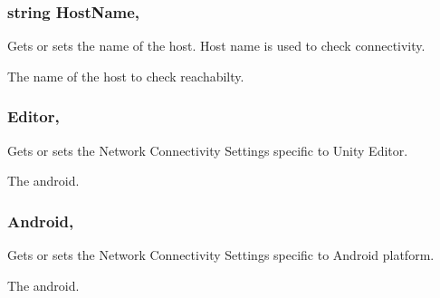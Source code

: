 \subsubsection[{Host\+Name}]{\setlength{\rightskip}{0pt plus 5cm}string Host\+Name\hspace{0.3cm}{\ttfamily [get]}, {\ttfamily [set]}}\label{class_voxel_busters_1_1_native_plugins_1_1_network_connectivity_settings_a6c401471a0edef2db0eef984406c3ae3}


Gets or sets the name of the host. Host name is used to check connectivity. 

The name of the host to check reachabilty.\hypertarget{class_voxel_busters_1_1_native_plugins_1_1_network_connectivity_settings_a5af8c9ccc82421a7a5d8b12e79870ff9}{}
\subsubsection[{Editor}]{ Editor\hspace{0.3cm}{\ttfamily [get]}, {\ttfamily [set]}}\label{class_voxel_busters_1_1_native_plugins_1_1_network_connectivity_settings_a5af8c9ccc82421a7a5d8b12e79870ff9}


Gets or sets the Network Connectivity Settings specific to Unity Editor. 

The android.\hypertarget{class_voxel_busters_1_1_native_plugins_1_1_network_connectivity_settings_a1c2d6ed884eda0a6f3e7bb4913332b0a}{}
\subsubsection[{Android}]{ Android\hspace{0.3cm}{\ttfamily [get]}, {\ttfamily [set]}}\label{class_voxel_busters_1_1_native_plugins_1_1_network_connectivity_settings_a1c2d6ed884eda0a6f3e7bb4913332b0a}


Gets or sets the Network Connectivity Settings specific to Android platform. 

The android.